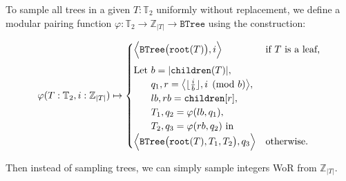 \documentclass[portrait,a0b,final,a4resizeable]{a0poster}
\def\jointspacing{\vspace{0.3in}}
\begin{document}
\begin{poster}
\begin{multicols}{2}

      \jointspacing

      \hspace*{2cm}\begin{minipage}[c]{0.90\columnwidth}
      To sample all trees in a given $T: \mathbb{T}_2$ uniformly without replacement, we define a modular pairing function $\varphi: \mathbb{T}_2 \rightarrow \mathbb{Z}_{|T|} \rightarrow \texttt{BTree}$ using the construction:
      \end{minipage}

      \begin{equation*}
        \varphi(T: \mathbb{T}_2, i: \mathbb{Z}_{|T|}) \mapsto \begin{cases}
          \Big\langle\texttt{BTree}\big(\texttt{root}(T)\big), i\Big\rangle & \text{if $T$ is a leaf,} \vspace{5pt}\\
          \text{Let } b = |\texttt{children}(T)|,\\
          \phantom{\text{Let }} q_1, r=\big\langle\lfloor\frac{i}{b}\rfloor, i \pmod{b}\big\rangle,\\
          \phantom{\text{Let }} lb, rb = \texttt{children}[r],\\
          \phantom{\text{Let }} T_1, q_2 = \varphi(lb, q_1),\\
          \phantom{\text{Let }} T_2, q_3 = \varphi(rb, q_2) \text{ in } \\
          \Big\langle\texttt{BTree}\big(\texttt{root}(T), T_1, T_2\big), q_3\Big\rangle & \text{otherwise.} \\
        \end{cases}
      \end{equation*}

      \hspace*{2cm}\begin{minipage}[c]{0.90\columnwidth}
      Then instead of sampling trees, we can simply sample integers WoR from $\mathbb{Z}_{|T|}$.\vspace{1.8cm}
      \end{minipage}

      \jointspacing

    \end{multicols}

    \vspace{-2.2cm}
    \bottombox{

}
\end{poster}
\end{document}
